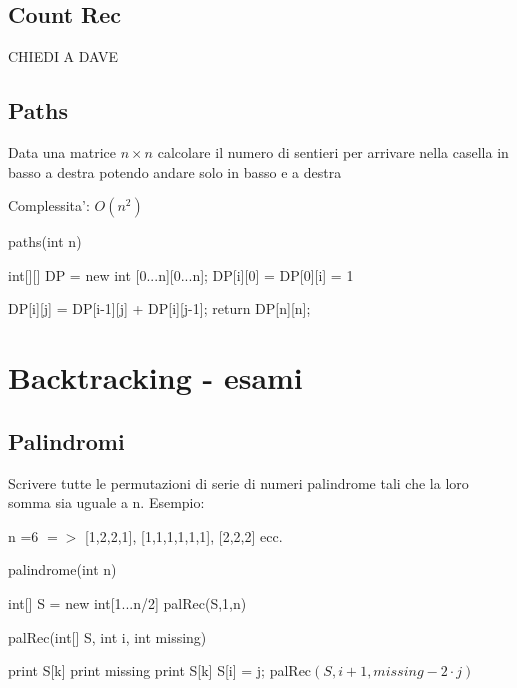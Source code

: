\documentclass[oneside]{book}
\begin{document}
\section{Count Rec}

CHIEDI A DAVE


\newpage
\section{Paths}
Data una matrice $n{\times}n$ calcolare il numero di sentieri per arrivare nella casella in basso a destra potendo andare solo in basso e a destra

Complessita': $O(n^2)$

\begin{algorithm}
\caption{paths(int n)\label{alg:cap}}
\begin{algorithmic}
\State int[][] DP = new int [0...n][0...n];
	\State DP[i][0] = DP[0][i] = 1
\EndFor

		\State DP[i][j] = DP[i-1][j] + DP[i][j-1];
	\EndFor
\EndFor
return DP[n][n];
\end{algorithmic}
\end{algorithm}


\chapter{Backtracking - esami}
\section{Palindromi}
Scrivere tutte le permutazioni di serie di numeri palindrome tali che la loro somma sia uguale a n. Esempio:

n =6 $=>$ [1,2,2,1], [1,1,1,1,1,1], [2,2,2] ecc.

\begin{algorithm}

\caption{palindrome(int n)\label{cap:alg}}
\begin{algorithmic}
\State int[] S = new int[1...n/2]
\State palRec(S,1,n)
\end{algorithmic}
\end{algorithm}

\begin{algorithm}

\caption{palRec(int[] S, int i, int missing)\label{cap:alg}}
\begin{algorithmic}
	\State print S[k]
\EndFor	
{}
	\State print missing
\EndIf
{}
	\State print S[k]
\EndFor
{}
	\State S[i] = j;
	palRec$(S,i+1,missing-2\cdot j)$
\EndFor
\end{algorithmic}
\end{algorithm}
\end{document}
